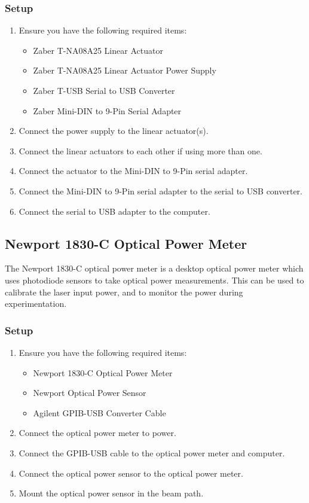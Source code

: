 \documentclass[11pt, letterpaper, titlepage]{article}
\begin{document}
\subsubsection{Setup} %
\begin{enumerate}
    \item Ensure you have the following required items:
    \begin{itemize}
        \item Zaber T-NA08A25 Linear Actuator
        \item Zaber T-NA08A25 Linear Actuator Power Supply
        \item Zaber T-USB Serial to USB Converter
        \item Zaber Mini-DIN to 9-Pin Serial Adapter
    \end{itemize}
    \item Connect the power supply to the linear actuator(s).
    \item Connect the linear actuators to each other if using more than one.
    \item Connect the actuator to the Mini-DIN to 9-Pin serial adapter.
    \item Connect the Mini-DIN to 9-Pin serial adapter to the serial to USB converter.
    \item Connect the serial to USB adapter to the computer.
\end{enumerate}
\subsection{Newport 1830-C Optical Power Meter} %
The Newport 1830-C optical power meter is a desktop optical power meter which uses photodiode sensors to take optical power measurements.
This can be used to calibrate the laser input power, and to monitor the power during experimentation.
\subsubsection{Setup} %
\begin{enumerate}
    \item Ensure you have the following required items:
    \begin{itemize}
        \item Newport 1830-C Optical Power Meter
        \item Newport Optical Power Sensor
        \item Agilent GPIB-USB Converter Cable
    \end{itemize}
    \item Connect the optical power meter to power.
    \item Connect the GPIB-USB cable to the optical power meter and computer.
    \item Connect the optical power sensor to the optical power meter.
    \item Mount the optical power sensor in the beam path.
\end{enumerate}
\end{document}

